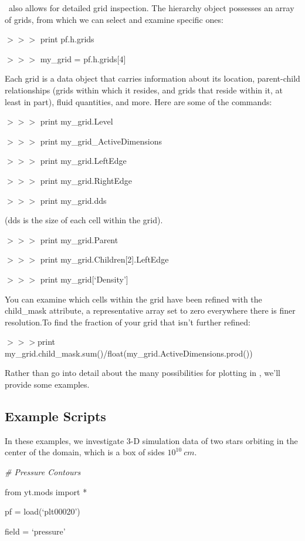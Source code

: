 \yt\ also allows for detailed grid inspection. The hierarchy object
possesses an array of grids, from which we can select and examine
specific ones:

{\scriptsize$>>>$} print pf.h.grids

{\scriptsize$>>>$} my\_grid = pf.h.grids[4]

Each grid is a data object that carries information about its
location, parent-child relationships (grids within which it resides, and
grids that reside within it, at least in part), fluid quantities, and
more. Here are some of the commands:

{\scriptsize$>>>$} print my\_grid.Level

{\scriptsize$>>>$} print my\_grid\_ActiveDimensions

{\scriptsize$>>>$} print my\_grid.LeftEdge

{\scriptsize$>>>$} print my\_grid.RightEdge

{\scriptsize$>>>$} print my\_grid.dds

(dds is the size of each cell within the grid).

{\scriptsize$>>>$} print my\_grid.Parent

{\scriptsize$>>>$} print my\_grid.Children[2].LeftEdge

{\scriptsize$>>>$} print my\_grid[`Density']

You can examine which cells within the grid have been refined with the
child\_mask attribute, a representative array set to zero everywhere
there is finer resolution.To find the fraction of your grid that isn't
further refined:

{\scriptsize$>>>$}print my\_grid.child\_mask.sum()/float(my\_grid.ActiveDimensions.prod())

Rather than go into detail about the many possibilities for plotting
in \yt, we'll provide some examples.

\subsection{Example Scripts}

In these examples, we investigate 3-D simulation data of two stars
orbiting in the center of the domain, which is a box of sides
$10^{10}\:cm$.


{\it\# Pressure Contours}
{\setlength{\parskip}{0pt}

from yt.mods import *
}

pf = load(`plt00020')

field = `pressure'

